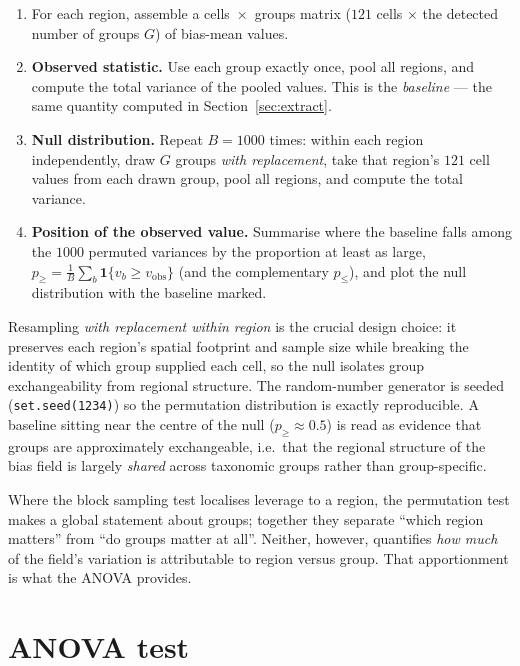 \begin{enumerate}
  \item For each region, assemble a cells~$\times$~groups matrix
        ($121$ cells $\times$ the detected number of groups $G$) of
        bias-mean values.
  \item \textbf{Observed statistic.} Use each group exactly once, pool all
        regions, and compute the total variance of the pooled values. This
        is the \emph{baseline} --- the same quantity computed in
        Section~\ref{sec:extract}.
  \item \textbf{Null distribution.} Repeat $B=1000$ times: within each
        region independently, draw $G$ groups \emph{with replacement}, take
        that region's $121$ cell values from each drawn group, pool all
        regions, and compute the total variance.
  \item \textbf{Position of the observed value.} Summarise where the
        baseline falls among the $1000$ permuted variances by the proportion
        at least as large,
        $p_{\ge}=\tfrac{1}{B}\sum_b \mathbf{1}\{v_b \ge v_{\mathrm{obs}}\}$
        (and the complementary $p_{\le}$), and plot the null distribution
        with the baseline marked.
\end{enumerate}

\noindent
Resampling \emph{with replacement within region} is the crucial design
choice: it preserves each region's spatial footprint and sample size while
breaking the identity of which group supplied each cell, so the null
isolates group exchangeability from regional structure. The random-number
generator is seeded (\texttt{set.seed(1234)}) so the permutation
distribution is exactly reproducible. A baseline sitting near the centre of
the null ($p_{\ge}\approx 0.5$) is read as evidence that groups are
approximately exchangeable, i.e.\ that the regional structure of the bias
field is largely \emph{shared} across taxonomic groups rather than
group-specific.

Where the block sampling test localises leverage to a region, the
permutation test makes a global statement about groups; together they
separate ``which region matters'' from ``do groups matter at all''. Neither,
however, quantifies \emph{how much} of the field's variation is attributable
to region versus group. That apportionment is what the ANOVA provides.

\section{ANOVA test}
\label{sec:anova}

